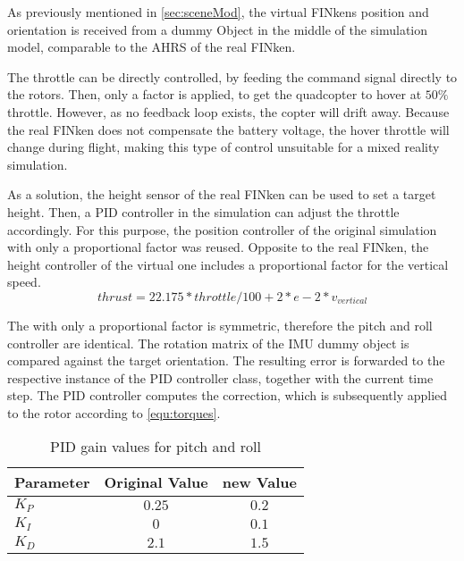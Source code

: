 As previously mentioned in \ref{sec:sceneMod}, the virtual FINkens position and orientation is received from a dummy Object in the middle of the simulation model, comparable to the \gls{AHRS} of the real FINken.

The throttle can be directly controlled, by feeding the command signal directly to the rotors. 
Then, only a factor is applied, to get the quadcopter to hover at $50 \%$ throttle. 
However, as no feedback loop exists, the copter will drift away.
Because the real FINken does not compensate the battery voltage, the hover throttle will change during flight, making this type of control unsuitable for a mixed reality simulation.

As a solution, the height sensor of the real FINken can be used to set a target height.
Then, a PID controller in the simulation can adjust the throttle accordingly.
For this purpose, the position controller of the original simulation with only a proportional factor was reused. 
Opposite to the real FINken, the height controller of the virtual one includes a proportional factor for the vertical speed.
\begin{equation}
thrust = 22.175 * throttle/100 +2 * e  - 2 *v_{vertical}
\end{equation}


The with only a proportional factor is symmetric, therefore the pitch and roll controller are identical.
The rotation matrix of the \gls{IMU} dummy object is compared against the target orientation.
The resulting error is forwarded to the respective instance of the PID controller class, together with the current time step.
The PID controller computes the correction, which is subsequently applied to the rotor according to \ref{equ:torques}.

\begin{table}[h]
	\centering
	\begin{tabular}{|l|c|c|}
    		\hline
		Parameter & Original Value & new Value \\
		\hline
    		$K_P$ & $0.25$ &  $0.2$\\
    		\hline
		$K_I$ & $0$ & $0.1$   \\
    		\hline
		$K_D$  & $2.1$ & $1.5$  \\
    		\hline
	\end{tabular}
    	\caption{PID gain values for pitch and roll}
      	\label{tab:PIDpitchroll}
\end{table}

